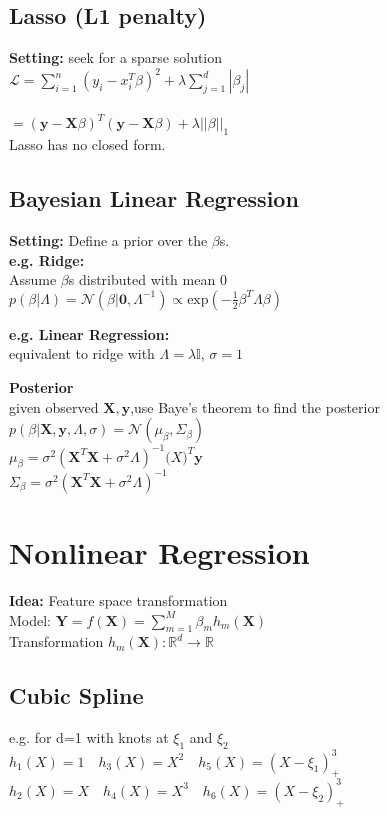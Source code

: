 \subsection*{Lasso (L1 penalty)}
\textbf{Setting:} seek for a sparse solution\\
$\mathcal{L} = \sum_{i=1}^n(y_i-x_i^T\beta)^2+\lambda\sum_{j=1}^d|\beta_j| $\\\\
$=(\mathbf{y}-\mathbf{X}\beta)^T(\mathbf{y}-\mathbf{X}\beta)+\lambda||\beta||_1$\\
Lasso has no closed form.

\subsection*{Bayesian Linear Regression}
\textbf{Setting:} Define a prior over the $\beta$s.\\
\textbf{e.g. Ridge:}\\
Assume $\beta$s distributed with mean 0\\
$p(\beta|\Lambda){=}\mathcal{N}(\beta|\mathbf{0},\Lambda^{-1}) \propto \mathrm{exp}(-\frac{1}{2}\beta^T\Lambda\beta)$

\textbf{e.g. Linear Regression:}\\
equivalent to ridge with $\Lambda{=}\lambda\mathbb{I}$, $\sigma{=}1$

\textbf{Posterior}\\
given observed $\mathbf{X},\mathbf{y}$,use Baye's theorem to find the posterior\\
$p(\beta|\mathbf{X},\mathbf{y}, \Lambda, \sigma) = \mathcal{N}(\mu_{\beta}, \Sigma_{\beta})$\\
$\mu_\beta = \sigma^2(\mathbf{X}^T\mathbf{X} +\sigma^2\Lambda)^{-1}\mathbf(X)^T\mathbf{y}$\\
$\Sigma_\beta = \sigma^2(\mathbf{X}^T\mathbf{X} +\sigma^2\Lambda)^{-1}$

\section*{Nonlinear Regression}
\textbf{Idea:} Feature space transformation\\
Model: $\mathbf{Y}=f(\mathbf{X})=\sum_{m=1}^M\beta_m h_m(\mathbf{X})$\\
Transformation $h_m(\mathbf{X}):\mathbb{R}^d \rightarrow \mathbb{R}$


\subsection*{Cubic Spline}
e.g. for d=1 with knots at $\xi_1$ and $\xi_2$\\
$h_1(X){=}1\quad h_3(X){=}X^2\quad h_5(X){=}(X{-}\xi_1)^3_+$
$h_2(X){=}X\quad h_4(X){=}X^3\quad h_6(X){=}(X{-}\xi_2)^3_+$

